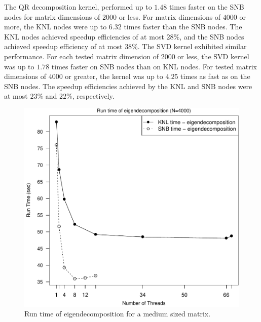 The QR decomposition kernel, performed up
to $1.48$ times faster on the SNB nodes for matrix dimensions of $2000$ or less. For
matrix dimensions of $4000$ or more, the KNL nodes were up to $6.32$ times faster than the
SNB nodes. The KNL nodes achieved speedup efficiencies of at most $28\%$, and
the SNB nodes achieved speedup efficiency of at most $38\%$. The SVD kernel
exhibited similar performance.  For each tested matrix dimension of $2000$ or less, the
SVD kernel was up to $1.78$ times faster on SNB nodes than on KNL nodes. For tested matrix
dimensions of $4000$ or greater, the kernel was up to $4.25$ times as fast as on the SNB
nodes. The speedup efficiencies achieved by the KNL and SNB nodes
were at most $23\%$ and $22\%$, respectively.
\begin{figure}
\includegraphics[height=\columnwidth, width=\columnwidth]{eigen_4000_68-rt.pdf}
\caption{Run time of eigendecomposition for a medium sized matrix.}
\label{fig:mediumEigenTime}
\end{figure}

